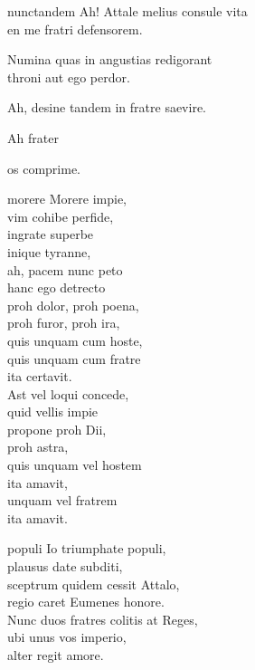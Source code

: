 \documentclass[tocstyle=ref-genre]{ees}
\begin{document}
{\begin{movement}{nunctandem}
  \voice[Basso]
  Ah! Attale melius consule vita\\
  en me fratri defensorem.

  \voice[Tenore]
  Numina quas in angustias redigorant\\
  throni aut ego perdor.

  \voice[Basso]
  Ah, desine tandem in fratre saevire.

  \voice[Tenore]
  Ah frater

  \voice[Alto]
  os comprime.
\end{movement}

\begin{movement}{morere}
  Morere impie,\\
  vim cohibe perfide,\\
  ingrate superbe\\
  inique tyranne,\\
  ah, pacem nunc peto\\
  hanc ego detrecto\\
  proh dolor, proh poena,\\
  proh furor, proh ira,\\
  quis unquam cum hoste,\\
  quis unquam cum fratre\\
  ita certavit.\\[1ex]
  Ast vel loqui concede,\\
  quid vellis impie\\
  propone proh Dii,\\
  proh astra,\\
  quis unquam vel hostem\\
  ita amavit,\\
  unquam vel fratrem\\
  ita amavit.
\end{movement}

\begin{movement}{populi}
  Io triumphate populi,\\
  plausus date subditi,\\
  sceptrum quidem cessit Attalo,\\
  regio caret Eumenes honore.\\[1ex]
  Nunc duos fratres colitis at Reges,\\
  ubi unus vos imperio,\\
  alter regit amore.
\end{movement}
}

\eesScore
\end{document}

